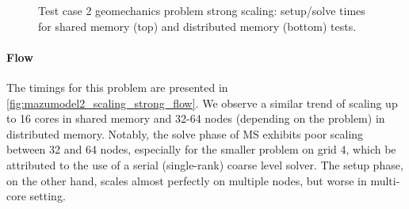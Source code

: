 \begin{figure} [htbp]
  \begin{subfigure}[t]{0.48\textwidth}
    \centering
    
  \end{subfigure}
  \hfill
  \begin{subfigure}[t]{0.48\textwidth}
  \hspace{\textwidth}
  \end{subfigure}
  \begin{subfigure}[t]{0.48\textwidth}
    \centering
    
  \end{subfigure}
  \hfill
  \begin{subfigure}[t]{0.48\textwidth}
    \centering
    
  \end{subfigure}
  \caption[Test case 2 geomechanics problem strong scaling]{Test case 2 geomechanics problem strong scaling: setup/solve times for shared memory (top) and distributed memory (bottom) tests.}
  \label{fig:mazumodel2_scaling_strong_mech}
\end{figure}

\paragraph{Flow}
The timings for this problem are presented in \cref{fig:mazumodel2_scaling_strong_flow}.   We observe a similar trend of scaling up to 16 cores in shared memory and 32-64 nodes (depending on the problem) in distributed memory.   Notably, the solve phase of MS exhibits poor scaling between 32 and 64 nodes, especially for the smaller problem on grid 4, which be attributed to the use of a serial (single-rank) coarse level solver.   The setup phase, on the other hand, scales almost perfectly on multiple nodes, but worse in multi-core setting.

